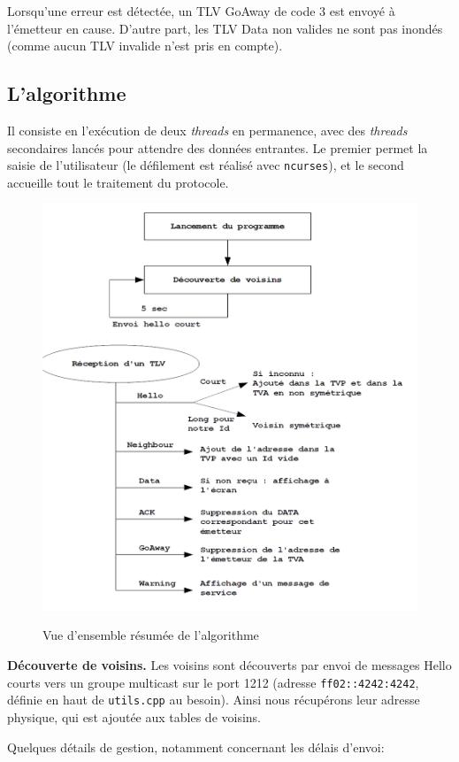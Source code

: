 \documentclass[11pt,a4paper]{article}
\begin{document}
Lorsqu'une erreur est détectée, un TLV GoAway de code 3 est envoyé à l'émetteur en cause. D'autre part, les TLV Data non valides ne sont pas inondés (comme aucun TLV invalide 
n'est pris en compte).

\subsection{L'algorithme}
	
	Il consiste en l'exécution de deux \emph{threads} en permanence, avec des \emph{threads} secondaires lancés pour attendre des données entrantes.
	Le premier permet la saisie de l'utilisateur (le défilement est réalisé avec \texttt{ncurses}), et le second accueille tout le traitement du protocole.
	
	\begin{figure}[ht!]
		\centering
			\includegraphics[width=.8\columnwidth]{img.png}
		\label{fig:img}
		\caption{Vue d'ensemble résumée de l'algorithme}
	\end{figure}
	
	\noindent\textbf{Découverte de voisins.} Les voisins sont découverts par envoi de messages Hello courts vers un groupe multicast sur le port 1212 (adresse
	\verb|ff02::4242:4242|, définie en haut de \texttt{utils.cpp} au besoin). Ainsi nous récupérons leur adresse physique, qui est ajoutée aux tables de voisins.
	
	Quelques détails de gestion, notamment concernant les délais d'envoi:
	
\end{document}
